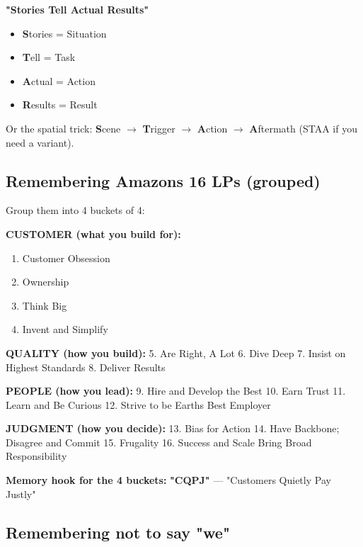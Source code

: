 \documentclass[11pt]{article}
\providecommand{\tightlist}{\setlength{\itemsep}{1pt}\setlength{\parskip}{0pt}}
\begin{document}
\textbf{"Stories Tell Actual Results"}

\begin{itemize}
\tightlist
\item
  \textbf{S}tories = Situation
\item
  \textbf{T}ell = Task
\item
  \textbf{A}ctual = Action
\item
  \textbf{R}esults = Result
\end{itemize}

Or the spatial trick: \textbf{S}cene \(\rightarrow\) \textbf{T}rigger \(\rightarrow\) \textbf{A}ction \(\rightarrow\) \textbf{A}ftermath (STAA if you need a variant).

\subsection{Remembering Amazon\textquotesingle s 16 LPs (grouped)}\label{remembering-amazons-16-lps-grouped}

Group them into 4 buckets of 4:

\textbf{CUSTOMER (what you build for):}

\begin{enumerate}
\def\labelenumi{\arabic{enumi}.}
\tightlist
\item
  Customer Obsession
\item
  Ownership
\item
  Think Big
\item
  Invent and Simplify
\end{enumerate}

\textbf{QUALITY (how you build):}
5. Are Right, A Lot
6. Dive Deep
7. Insist on Highest Standards
8. Deliver Results

\textbf{PEOPLE (how you lead):}
9. Hire and Develop the Best
10. Earn Trust
11. Learn and Be Curious
12. Strive to be Earth\textquotesingle s Best Employer

\textbf{JUDGMENT (how you decide):}
13. Bias for Action
14. Have Backbone; Disagree and Commit
15. Frugality
16. Success and Scale Bring Broad Responsibility

\textbf{Memory hook for the 4 buckets:} \textbf{"CQPJ"} --- "Customers Quietly Pay Justly"

\subsection{Remembering not to say "we"}\label{remembering-not-to-say-we}
\end{document}
